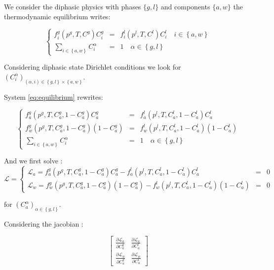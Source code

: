 \documentclass{article}
\begin{document}
We consider the diphasic physics with phases $\{g, l\}$ and components $\{a, w\}$ the thermodynamic equilibrium writes:

\begin{equation} \label{eq:equilibrium}
\left\{
\begin{array}{rcl}
f^g_i(p^g, T, C^g) C^g_i & = & f^l_i(p^l, T, C^l) C^l_i \quad i\in\left\{a, w\right\} \\
\sum_{i\in\left\{a, w\right\}} C^\alpha_i & = & 1 \quad \alpha \in\left\{g, l\right\}
\end{array}
\right.
\end{equation}

Considering diphasic state Dirichlet conditions we look for $\left(C^\alpha_i\right)_{\left(\alpha, i\right)\in\left\{g, l\right\}\times\left\{a, w\right\}}$.

System \eqref{eq:equilibrium} rewrites:

\begin{equation}
\left\{
\begin{array}{rcl}
f^g_a(p^g, T, C^g_a, 1 - C^g_a) C^g_a & = & f^l_a(p^l, T, C^l_a, 1 - C^l_a)C^l_a \\
f^g_w(p^g, T, C^g_a, 1 - C^g_a)\left(1 - C^g_a\right) & = & f^l_w(p^l, T, C^l_a, 1 - C^l_a)\left(1 - C^l_a\right) \\
\sum_{i\in\left\{a, w\right\}} C^\alpha_i & = & 1 \quad \alpha \in\left\{g, l\right\}
\end{array}
\right.
\end{equation}

And we first solve :
\begin{equation}
\mathcal{L} =
\left\{
\begin{array}{rcl}
\mathcal{L}_a = f^g_a(p^g, T, C^g_a, 1 - C^g_a) C^g_a -  f^l_a(p^l, T, C^l_a, 1 - C^l_a)C^l_a & = & 0 \\
\mathcal{L}_w = f^g_w(p^g, T, C^g_a, 1 - C^g_a)\left(1 - C^g_a\right) -  f^l_w(p^l, T, C^l_a, 1 - C^l_a)\left(1 - C^l_a\right) & = & 0
\end{array}
\right.
\end{equation}

for $\left(C^\alpha_a\right)_{\alpha\in\left\{g, l\right\}}$.

Considering the jacobian :

\begin{equation}
\left[
\begin{array}{cc}
\frac{\partial\mathcal{L}_a}{\partial C^g_a} & \frac{\partial\mathcal{L}_a}{\partial C^l_a} \\
\frac{\partial\mathcal{L}_w}{\partial C^g_a} & \frac{\partial\mathcal{L}_w}{\partial C^l_a}
\end{array}
\right]
\end{equation}
\end{document}
